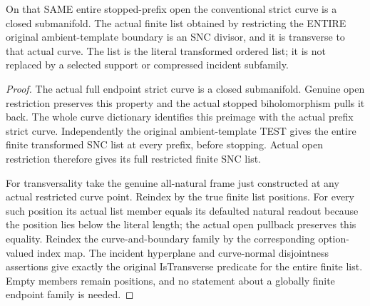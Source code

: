 \begin{theorem}
\label{hir:sharp-actual-curve-stopped-prefix-finite-sharp-predicates}
\leanok
On that SAME entire stopped-prefix open the conventional strict curve is
a closed submanifold. The actual finite list obtained by restricting the
ENTIRE original ambient-template boundary is an SNC divisor, and it is
transverse to that actual curve. The list is the literal transformed
ordered list; it is not replaced by a selected support or compressed
incident subfamily.
\end{theorem}
\begin{proof}
The actual full endpoint strict curve is a closed submanifold. Genuine
open restriction preserves this property and the actual stopped
biholomorphism pulls it back. The whole curve dictionary identifies this
preimage with the actual prefix strict curve. Independently the original
ambient-template TEST gives the entire finite transformed SNC list at
every prefix, before stopping. Actual open restriction therefore gives
its full restricted finite SNC list.

For transversality take the genuine all-natural frame just constructed
at any actual restricted curve point. Reindex by the true finite list
positions. For every such position its actual list member equals its
defaulted natural readout because the position lies below the literal
length; the actual open pullback preserves this equality. Reindex the
curve-and-boundary family by the corresponding option-valued index map.
The incident hyperplane and curve-normal disjointness assertions give
exactly the original IsTransverse predicate for the entire finite list.
Empty members remain positions, and no statement about a globally finite
endpoint family is needed.
\end{proof}

